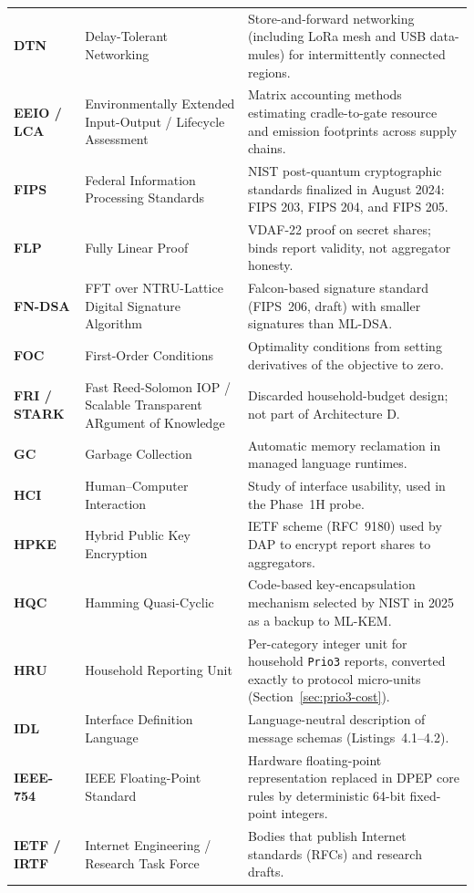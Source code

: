 \documentclass[10pt,twoside,openany]{book}
\theoremstyle{dpepstyle}
\begin{document}
{\begin{longtable}{L{0.92in} L{1.75in} L{1.95in}}
\textbf{DTN} & Delay-Tolerant Networking & Store-and-forward networking (including LoRa mesh and USB data-mules) for intermittently connected regions. \\
\textbf{EEIO / LCA} & Environmentally Extended Input-Output / Lifecycle Assessment & Matrix accounting methods estimating cradle-to-gate resource and emission footprints across supply chains. \\
\textbf{FIPS} & Federal Information Processing Standards & NIST post-quantum cryptographic standards finalized in August 2024: FIPS 203, FIPS 204, and FIPS 205. \\
\textbf{FLP} & Fully Linear Proof & VDAF-22 proof on secret shares; binds report validity, not aggregator honesty. \\
\textbf{FN-DSA} & FFT over NTRU-Lattice Digital Signature Algorithm & Falcon-based signature standard (FIPS~206, draft) with smaller signatures than ML-DSA. \\
\textbf{FOC} & First-Order Conditions & Optimality conditions from setting derivatives of the objective to zero. \\
\textbf{FRI / STARK} & Fast Reed-Solomon IOP / Scalable Transparent ARgument of Knowledge & Discarded household-budget design; not part of Architecture D. \\
\textbf{GC} & Garbage Collection & Automatic memory reclamation in managed language runtimes. \\
\textbf{HCI} & Human--Computer Interaction & Study of interface usability, used in the Phase~1H probe. \\
\textbf{HPKE} & Hybrid Public Key Encryption & IETF scheme (RFC~9180) used by DAP to encrypt report shares to aggregators. \\
\textbf{HQC} & Hamming Quasi-Cyclic & Code-based key-encapsulation mechanism selected by NIST in 2025 as a backup to ML-KEM. \\
\textbf{HRU} & Household Reporting Unit & Per-category integer unit for household \texttt{Prio3} reports, converted exactly to protocol micro-units (Section~\ref{sec:prio3-cost}). \\
\textbf{IDL} & Interface Definition Language & Language-neutral description of message schemas (Listings~4.1--4.2). \\
\textbf{IEEE-754} & IEEE Floating-Point Standard & Hardware floating-point representation replaced in DPEP core rules by deterministic 64-bit fixed-point integers. \\
\textbf{IETF / IRTF} & Internet Engineering / Research Task Force & Bodies that publish Internet standards (RFCs) and research drafts. \\

\end{longtable}}
\end{document}
